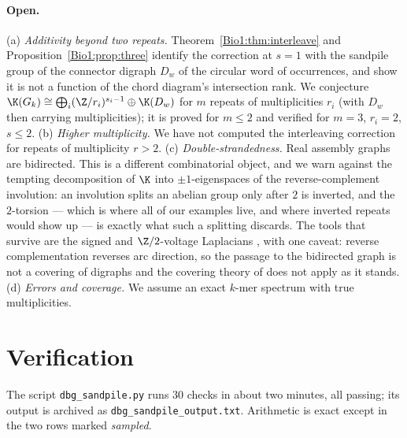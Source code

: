 \paragraph{Open.} (a) \emph{Additivity beyond two repeats.} Theorem~\ref{Bio1:thm:interleave}
and Proposition~\ref{Bio1:prop:three} identify the correction at $s=1$ with the sandpile group
of the connector digraph $D_w$ of the circular word of occurrences, and show it is not a
function of the chord diagram's intersection rank. We conjecture
$\K(G_k)\cong\bigoplus_i(\Z/r_i)^{s_i-1}\oplus\K(D_w)$ for $m$ repeats of multiplicities
$r_i$ (with $D_w$ then carrying multiplicities); it is proved for $m\le2$ and verified for
$m=3$, $r_i=2$, $s\le2$. (b) \emph{Higher multiplicity.} We have not
computed the interleaving correction for repeats of multiplicity $r>2$. (c)
\emph{Double-strandedness.} Real assembly graphs are bidirected. This is a different
combinatorial object, and we warn against the tempting decomposition of $\K$ into
$\pm1$-eigenspaces of the reverse-complement involution: an involution splits an abelian
group only after $2$ is inverted, and the $2$-torsion --- which is where all of our
examples live, and where inverted repeats would show up --- is exactly what such a
splitting discards. The tools that survive are the signed and $\Z/2$-voltage Laplacians
\cite{Zaslavsky,RT}, with one caveat: reverse complementation reverses arc direction, so
the passage to the bidirected graph is not a covering of digraphs and the covering theory
of \cite{RT} does not apply as it stands. (d) \emph{Errors and coverage.} We assume an exact $k$-mer spectrum
with true multiplicities.

\section{Verification}\label{Bio1:sec:battery}

The script \texttt{dbg\_sandpile.py} runs $30$ checks in about two minutes, all passing; its
output is archived as \texttt{dbg\_sandpile\_output.txt}. Arithmetic is exact except in the
two rows marked \emph{sampled}.

